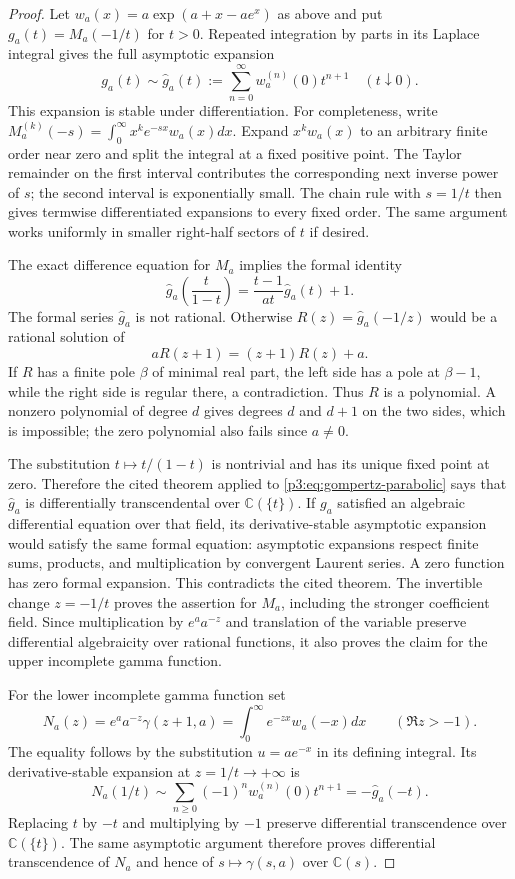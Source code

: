 \documentclass[11pt,a4paper]{article}
\theoremstyle{definition}
\theoremstyle{remark}
\numberwithin{equation}{section}
\begin{document}
\begin{proof}
Let $w_a(x)=a\exp(a+x-ae^x)$ as above and put $g_a(t)=M_a(-1/t)$
for $t>0$. Repeated integration by parts in its Laplace integral gives
the full asymptotic expansion
\[
 g_a(t)\sim\widehat g_a(t):=
       \sum_{n=0}^\infty w_a^{(n)}(0)t^{n+1}\quad(t\downarrow0).
\]
This expansion is stable under differentiation. For completeness,
write $M_a^{(k)}(-s)=\int_0^\infty x^ke^{-sx}w_a(x)dx$.
Expand $x^kw_a(x)$ to an arbitrary finite order near zero and split
the integral at a fixed positive point. The Taylor remainder on the
first interval contributes the corresponding next inverse power of
$s$; the second interval is exponentially small. The chain rule
with $s=1/t$ then gives termwise differentiated expansions to every
fixed order. The same argument works uniformly in smaller right-half
sectors of $t$ if desired.

The exact difference equation for $M_a$ implies the formal identity
\begin{equation}\label{p3:eq:gompertz-parabolic}
 \widehat g_a\left(\frac{t}{1-t}\right)
   =\frac{t-1}{at}\widehat g_a(t)+1.
\end{equation}
The formal series $\widehat g_a$ is not rational. Otherwise
$R(z)=\widehat g_a(-1/z)$ would be a rational solution of
\[
 aR(z+1)=(z+1)R(z)+a.
\]
If $R$ has a finite pole $\beta$ of minimal real part, the left
side has a pole at $\beta-1$, while the right side is regular there,
a contradiction. Thus $R$ is a polynomial. A nonzero polynomial of
degree $d$ gives degrees $d$ and $d+1$ on the two sides, which is
impossible; the zero polynomial also fails since $a\ne0$.

The substitution $t\mapsto t/(1-t)$ is nontrivial and has its unique
fixed point at zero. Therefore the cited theorem applied to
\eqref{p3:eq:gompertz-parabolic} says that $\widehat g_a$ is
differentially transcendental over $\mathbb C(\{t\})$.
If $g_a$ satisfied an algebraic differential equation over that field,
its derivative-stable asymptotic expansion would satisfy the same
formal equation: asymptotic expansions respect finite sums, products,
and multiplication by convergent Laurent series. A zero function has
zero formal expansion. This contradicts the cited theorem.
The invertible change $z=-1/t$ proves the assertion for $M_a$,
including the stronger coefficient field. Since multiplication by
$e^aa^{-z}$ and translation of the variable preserve differential
algebraicity over rational functions, it also proves the claim for
the upper incomplete gamma function.

For the lower incomplete gamma function set
\[
 N_a(z)=e^aa^{-z}\gamma(z+1,a)
       =\int_0^\infty e^{-zx}w_a(-x)dx
       \qquad(\Re z>-1).
\]
The equality follows by the substitution $u=ae^{-x}$ in its defining
integral. Its derivative-stable expansion at $z=1/t\to+\infty$ is
\[
 N_a(1/t)\sim\sum_{n\ge0}(-1)^nw_a^{(n)}(0)t^{n+1}
            =-\widehat g_a(-t).
\]
Replacing $t$ by $-t$ and multiplying by $-1$ preserve differential
transcendence over $\mathbb C(\{t\})$. The same asymptotic argument
therefore proves differential transcendence of $N_a$ and hence of
$s\mapsto\gamma(s,a)$ over $\mathbb C(s)$.
\end{proof}
\end{document}
